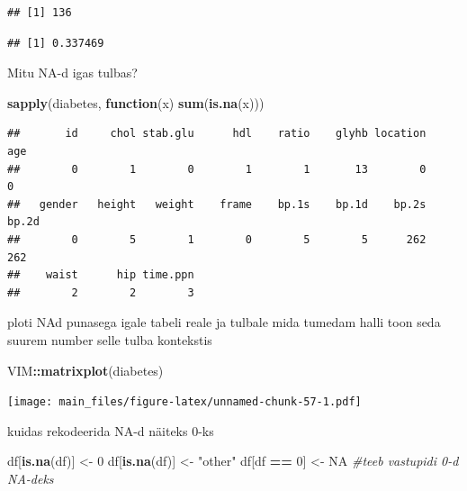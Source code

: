 \documentclass[]{book}
\newenvironment{Shaded}{\begin{snugshade}}{\end{snugshade}}
\newcommand{\KeywordTok}[1]{\textcolor[rgb]{0.13,0.29,0.53}{\textbf{#1}}}
\newcommand{\DecValTok}[1]{\textcolor[rgb]{0.00,0.00,0.81}{#1}}
\newcommand{\StringTok}[1]{\textcolor[rgb]{0.31,0.60,0.02}{#1}}
\newcommand{\CommentTok}[1]{\textcolor[rgb]{0.56,0.35,0.01}{\textit{#1}}}
\newcommand{\OtherTok}[1]{\textcolor[rgb]{0.56,0.35,0.01}{#1}}
\newcommand{\ControlFlowTok}[1]{\textcolor[rgb]{0.13,0.29,0.53}{\textbf{#1}}}
\newcommand{\OperatorTok}[1]{\textcolor[rgb]{0.81,0.36,0.00}{\textbf{#1}}}
\newcommand{\NormalTok}[1]{#1}
\begin{document}
\begin{verbatim}
## [1] 136
\end{verbatim}

\begin{Shaded}
\end{Shaded}

\begin{verbatim}
## [1] 0.337469
\end{verbatim}

Mitu NA-d igas tulbas?

\begin{Shaded}
\begin{Highlighting}[]
 \KeywordTok{sapply}\NormalTok{(diabetes, }\ControlFlowTok{function}\NormalTok{(x) }\KeywordTok{sum}\NormalTok{(}\KeywordTok{is.na}\NormalTok{(x))) }
\end{Highlighting}
\end{Shaded}

\begin{verbatim}
##       id     chol stab.glu      hdl    ratio    glyhb location      age 
##        0        1        0        1        1       13        0        0 
##   gender   height   weight    frame    bp.1s    bp.1d    bp.2s    bp.2d 
##        0        5        1        0        5        5      262      262 
##    waist      hip time.ppn 
##        2        2        3
\end{verbatim}

ploti NAd punasega igale tabeli reale ja tulbale mida tumedam halli toon
seda suurem number selle tulba kontekstis

\begin{Shaded}
\begin{Highlighting}[]
\NormalTok{VIM}\OperatorTok{::}\KeywordTok{matrixplot}\NormalTok{(diabetes) }
\end{Highlighting}
\end{Shaded}

\texttt{[image: main\_files/figure-latex/unnamed-chunk-57-1.pdf]}

kuidas rekodeerida NA-d näiteks 0-ks

\begin{Shaded}
\begin{Highlighting}[]
\NormalTok{df[}\KeywordTok{is.na}\NormalTok{(df)] <-}\StringTok{ }\DecValTok{0}
\NormalTok{df[}\KeywordTok{is.na}\NormalTok{(df)] <-}\StringTok{ "other"}
\NormalTok{df[df }\OperatorTok{==}\StringTok{ }\DecValTok{0}\NormalTok{] <-}\StringTok{ }\OtherTok{NA} \CommentTok{#teeb vastupidi 0-d NA-deks}
\end{Highlighting}
\end{Shaded}
\end{document}
